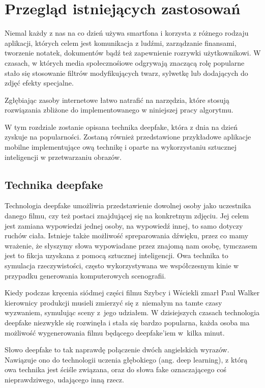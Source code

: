\chapter{Przegląd istniejących zastosowań}

Niemal każdy z nas na co dzień używa smartfona i korzysta z różnego rodzaju aplikacji, których celem jest komunikacja z ludźmi, zarządzanie finansami, tworzenie notatek, dokumentów bądź też zapewnienie rozrywki użytkownikowi. W czasach, w których media społecznośiowe odgrywają znaczącą rolę popularne stało się stosowanie filtrów modyfikujących twarz, sylwetkę lub dodających do zdjęć efekty specjalne. 

Zgłębiając zasoby internetowe łatwo natrafić na narzędzia, które stosują rozwiązania zbliżone do implementowanego w niniejszej pracy algorytmu.

W tym rozdziale zostanie opisana technika deepfake, która z dnia na dzień zyskuje na popularności. Zostaną również przedstawione przykładowe aplikacje mobilne implementujące ową technikę i oparte na wykorzystaniu sztucznej inteligencji w przetwarzaniu obrazów. 


\section{Technika deepfake}
Technologia deepfake umożliwia przedstawienie dowolnej osoby jako uczestnika danego filmu, czy też postaci znajdującej się na konkretnym zdjęciu. Jej celem jest zamiana wypowiedzi jednej osoby, na wypowiedź innej, to samo dotyczy ruchów ciała. Istnieje także możliwość spreparowania dźwięku, przez co mamy wrażenie, że słyszymy słowa wypowiadane przez znajomą nam osobę, tymczasem jest to fikcja uzyskana z pomocą sztucznej inteligencji. Owa technika to symulacja rzeczywistości, często wykorzystywana we współczesnym kinie w przypadku generowania komputerowych scenografii.

Kiedy podczas kręcenia siódmej części filmu Szybcy i Wściekli zmarł Paul Walker kierownicy produkcji musieli zmierzyć się z~niemałym na tamte czasy wyzwaniem, symulując sceny z~jego udziałem. W dzisiejszych czasach technologia deepfake niezwykle się rozwinęła i stała się bardzo popularna, każda osoba ma możliwość wygenerowania filmu będącego deepfake'iem w~kilka minut.

Słowo deepfake to tak naprawdę połączenie dwóch angielskich wyrazów. Nawiązuje ono do technologii uczenia głębokiego (ang. deep learning), z którą owa technika jest ściśle związana, oraz do słowa fake oznaczającego coś nieprawdziwego, udającego inną rzecz.

